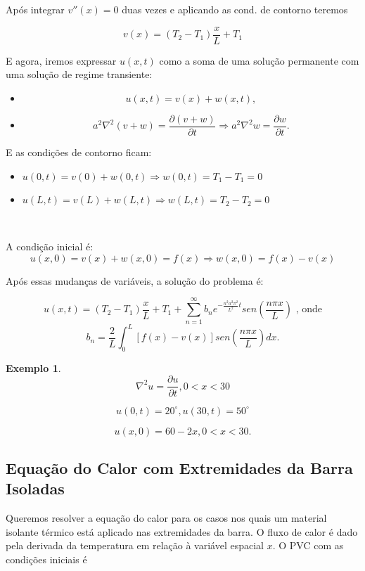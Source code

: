\documentclass[a4paper,portuguese,9pt,final]{extarticle}
\newtheorem{example}{Exemplo}[section]
\providecommand{\sin}{} \renewcommand{\sin}{sen}
\begin{document}
\begin{multicols*}{2}
        Após integrar $v''(x)=0$ duas vezes e aplicando as cond. de contorno teremos 

        $$ v(x)=(T_{2}-T_{1}) \frac{x}{L} + T_{1} $$

        E agora, iremos expressar $ u(x,t) $ como a soma de uma solução permanente com uma solução de regime transiente:
        \begin{itemize}
            \item[] $$u(x,t)=v(x)+w(x,t),$$
            \item[] $$a^{2}\nabla^{2}(v+w) =  \frac{\partial (v+w)}{\partial t} \Rightarrow a^{2}\nabla^{2}w = \frac{\partial w}{\partial t}.$$
        \end{itemize}

        E as condições de contorno ficam:
        \begin{itemize}
            \item[] $ u(0,t) = v(0) + w(0,t) \Rightarrow w(0,t) = T_{1}-T_{1} = 0 $
            \item[] $ u(L,t) = v(L) + w(L,t) \Rightarrow w(L,t) = T_{2}-T_{2} = 0 $
        \end{itemize}
        \

        A condição inicial é:
        $$ u(x,0)=v(x)+w(x,0)=f(x) \Rightarrow w(x,0) = f(x)-v(x) $$

        Após essas mudanças de variáveis, a solução do problema é:

        $$  u(x,t)=(T_{2}-T_{1})\frac{x}{L} + T_{1} + \sum_{n=1}^{\infty} b_{n} e^{-\frac{n^{2}a^{2}\pi^{2}}{L^{2}}t} \sin \left(\frac{n \pi x}{L}\right) \mbox{ \ , onde}   $$
        $$  b_{n}=\frac{2}{L} \int_{0}^{L} [f(x)-v(x) ] \sin \left(\frac{n \pi x}{L}\right) dx.$$

        \begin{example}	
            $$\nabla^2 u = \frac{\partial u}{\partial t}, 0<x<30$$

            $$u(0,t) = 20^{\circ}, u(30,t) = 50^{\circ}$$

            $$u(x,0) = 60 - 2x, 0<x<30.$$
        \end{example}

        \subsection{Equação do Calor com Extremidades da Barra Isoladas}

        Queremos resolver a equação do calor para os casos nos quais um material isolante térmico está aplicado nas extremidades da barra. O fluxo de calor é dado pela derivada da temperatura em relação à variável espacial $x$. O PVC com as condições iniciais é


\end{multicols*}
\end{document}
